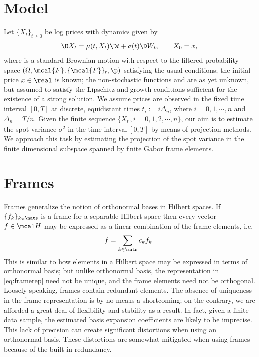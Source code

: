 \section{Model} \label{sec:model}
Let $\{X_t\}_{t\ge 0}$ be  log prices with dynamics given by  
\begin{align}
  \D X_t =   \mu(t, X_t) \D t + \sigma(t) \D W_t, \qquad X_0 = x,  
  \label{eq:pdynamics}
\end{align}
where \sbm is a standard Brownian motion with respect to the filtered probability space $(\Omega, \mcal{F}, \{\mcal{F}\}_t, \p)$ satisfying the usual conditions; the initial price $x \in \real$ is known; the non-stochastic functions \idp and \ivp are as yet unknown, but assumed to satisfy the Lipschitz and growth conditions sufficient for the existence of a strong solution. We assume prices are observed in the fixed time interval  $[0,T]$ at discrete, equidistant times $t_i := i\Delta_n$, where  $i= 0,1,\cdots,n$ and $\Delta_n = T/n$. Given the finite sequence  $\{X_{t_i}, i=0,1,2,\cdots,n\}$, our aim is to estimate the spot variance $\sigma^2$ in the time interval $[0,T]$ by means of projection methods. We approach this task  by estimating the projection  of the spot variance in  the finite dimensional subspace spanned by finite Gabor frame elements.  
\section{ Frames}\label{sec:gabor} 
Frames generalize the notion of orthonormal bases in  Hilbert spaces. If $\{f_k\}_{k \in \nats}$ is a frame for a separable Hilbert space \hs then every vector $f \in \hs$ may be expressed as a linear combination of the frame elements, i.e.
\begin{align}
  f = \sumn c_k f_k.
  \label{eq:framerep}
\end{align}
This is similar to how elements in a Hilbert space may be expressed in terms of orthonormal basis; but unlike orthonormal basis, the representation in \eqref{eq:framerep} need not be unique, and the frame elements need not be orthogonal. Loosely speaking, frames contain redundant elements. The absence of uniqueness in the frame representation is by no means a shortcoming; on the contrary, we are afforded a great deal of flexibility and stability as a result. In fact, given a finite data sample, the estimated basis expansion coefficients are likely to be imprecise. This lack of precision can create significant distortions when using an orthonormal basis. These distortions are somewhat mitigated when using frames because of the built-in redundancy.   



